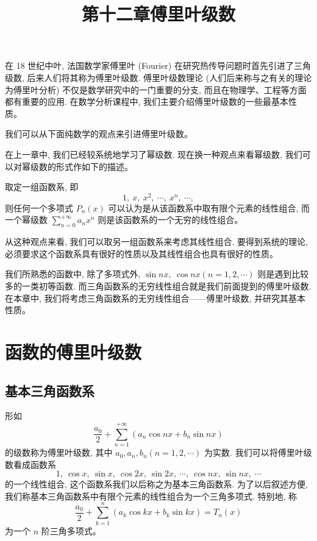 \documentclass[UTF8, 12pt, fontset=fandol, oneside]{ctexart}
\title{第十二章\quad 傅里叶级数}
\author{}
\date{}
\begin{document}
\maketitle

在 18 世纪中叶, 法国数学家傅里叶 (Fourier) 在研究热传导问题时首先引进了三角级数, 后来人们将其称为傅里叶级数. 傅里叶级数理论 (人们后来称与之有关的理论为傅里叶分析) 不仅是数学研究中的一门重要的分支, 而且在物理学、工程等方面都有重要的应用. 在数学分析课程中, 我们主要介绍傅里叶级数的一些最基本性质。

我们可以从下面纯数学的观点来引进傅里叶级数。

在上一章中, 我们已经较系统地学习了幂级数. 现在换一种观点来看幂级数, 我们可以对幂级数的形式作如下的描述。

取定一组函数系, 即
\[
  1,\ x,\ x^2,\ \cdots,\ x^n,\ \cdots,
\]
则任何一个多项式 $P_n(x)$ 可以认为是从该函数系中取有限个元素的线性组合, 而一个幂级数 $\sum\limits_{n=0}^{+\infty}a_nx^n$ 则是该函数系的一个无穷的线性组合。

从这种观点来看, 我们可以取另一组函数系来考虑其线性组合. 要得到系统的理论, 必须要求这个函数系具有很好的性质以及其线性组合也具有很好的性质。

我们所熟悉的函数中, 除了多项式外, $\sin nx,\ \cos nx(n=1,2,\cdots)$ 则是遇到比较多的一类初等函数. 而三角函数系的无穷线性组合就是我们前面提到的傅里叶级数. 在本章中, 我们将考虑三角函数系的无穷线性组合——傅里叶级数, 并研究其基本性质。

\section{函数的傅里叶级数}

\subsection{基本三角函数系}

形如
\[
  \frac{a_0}{2}+\sum_{n=1}^{+\infty}(a_n\cos nx+b_n\sin nx)
\]
的级数称为傅里叶级数, 其中 $a_0,a_n,b_n(n=1,2,\cdots)$ 为实数. 我们可以将傅里叶级数看成函数系
\begin{equation}
  1,\ \cos x,\ \sin x,\ \cos 2x,\ \sin 2x,\ \cdots,\ \cos nx,\ \sin nx,\ \cdots
  \tag{12.1.1}
\end{equation}
的一个线性组合, 这个函数系我们以后称之为基本三角函数系. 为了以后叙述方便, 我们称基本三角函数系中有限个元素的线性组合为一个三角多项式. 特别地, 称
\[
  \frac{a_0}{2}+\sum_{k=1}^n(a_k\cos kx+b_k\sin kx)=T_n(x)
\]
为一个 $n$ 阶三角多项式。
\end{document}
